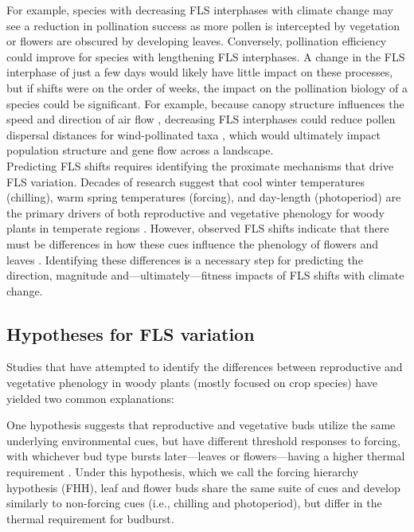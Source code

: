 \documentclass[11pt]{article}\usepackage[]{graphicx}\usepackage[]{color}
\begin{document}
\noindent For example, species with decreasing FLS interphases with climate change may see a reduction in pollination success as more pollen is intercepted by vegetation or flowers are obscured by developing leaves. Conversely, pollination efficiency could improve for species with lengthening FLS interphases. A change in the FLS interphase of just a few days would likely have little impact on these processes, but if shifts were on the order of weeks, the impact on the pollination biology of a species could be significant. For example, because canopy structure influences the speed and direction of air flow \citep{Niklas1985, Jackson:1999aa}, decreasing FLS interphases could reduce pollen dispersal distances for wind-pollinated taxa \citep{Milleron2012}, which would ultimately impact population structure and gene flow across a landscape.\\

\noindent Predicting FLS shifts requires identifying the proximate mechanisms that drive FLS variation. Decades of research suggest that cool winter temperatures (chilling), warm spring temperatures (forcing), and day-length (photoperiod) are the primary drivers of both reproductive and vegetative phenology  for woody plants in temperate regions \citep{Forrest2010,Flynn2018}. However, observed FLS shifts indicate that there must be differences in how these cues influence the phenology of flowers and leaves \citep{Buonaiuto2020}. Identifying these differences is a necessary step for predicting the direction, magnitude and---ultimately---fitness impacts of FLS shifts with climate change.

\subsection*{Hypotheses for FLS variation}

\noindent Studies that have attempted to identify the differences between reproductive and vegetative phenology in woody plants (mostly focused on crop species) have yielded two common explanations:

\noindent One hypothesis suggests that reproductive and vegetative buds utilize the same underlying environmental cues, but have different threshold responses to forcing, with whichever bud type bursts later---leaves or flowers---having a higher thermal requirement \citep[that is, they need a great sum of warm temperature to trigger the phenological event,][]{Guo2014,COSMULESCU:2020aa,Cosmulescu:2018aa}. Under this hypothesis, which we call the forcing hierarchy hypothesis (FHH), leaf and flower buds share the same suite of cues and develop similarly to non-forcing cues (i.e., chilling and photoperiod), but differ in the thermal requirement for budburst.\\
\end{document}
